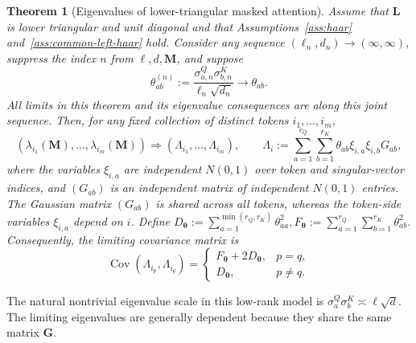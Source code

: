 \documentclass{article}
\newcommand{\weak}{\Rightarrow}
\newcommand{\bM}{\mathbf{M}}
\newcommand{\bL}{\mathbf{L}}
\newcommand{\bG}{\mathbf{G}}
\newtheorem{theorem}{Theorem}
\theoremstyle{definition}
\theoremstyle{remark}
\begin{document}
\begin{theorem}[Eigenvalues of lower-triangular masked attention]
Assume that $\bL$ is lower triangular and unit diagonal and that
Assumptions~\ref{ass:haar} and~\ref{ass:common-left-haar} hold.  Consider any sequence
$(\ell_n,d_n)\to(\infty,\infty)$, suppress the index $n$ from $\ell,d,\bM$, and
suppose
\[
    \theta_{ab}^{(n)}
    :=
    \frac{\sigma^Q_{a,n}\sigma^K_{b,n}}{\ell_n\sqrt {d_n}}
    \longrightarrow \theta_{ab}.
\]
All limits in this theorem and its eigenvalue consequences are along this
joint sequence.
Then, for any fixed collection of distinct tokens $i_1,\ldots,i_m$,
\begin{equation}
    \left(\lambda_{i_1}(\bM),\ldots,\lambda_{i_m}(\bM)\right)
    \weak
    \left(\Lambda_{i_1},\ldots,\Lambda_{i_m}\right),
    \qquad
    \Lambda_i
    :=
    \sum_{a=1}^{r_Q}\sum_{b=1}^{r_K}
    \theta_{ab}\xi_{i,a}\xi_{i,b}G_{ab},
    \label{eq:common-haar-eigenvalue-limit}
\end{equation}
where the variables $\xi_{i,a}$ are independent $N(0,1)$ over token and
singular-vector indices, and $(G_{ab})$ is an independent matrix of independent
$N(0,1)$ entries.  The Gaussian matrix $(G_{ab})$ is shared across all tokens,
whereas the token-side variables $\xi_{i,a}$ depend on $i$.  Define
\(
    D_{\boldsymbol{\theta}}
    :=
    \sum_{a=1}^{\min(r_Q,r_K)}\theta_{aa}^2,
    F_{\boldsymbol{\theta}}
    :=
    \sum_{a=1}^{r_Q}\sum_{b=1}^{r_K}\theta_{ab}^2.
\)
Consequently, the limiting covariance matrix is
\begin{equation}
    \operatorname{Cov}\left(\Lambda_{i_p},\Lambda_{i_q}\right)
    =
    \begin{cases}
    F_{\boldsymbol{\theta}}+2D_{\boldsymbol{\theta}},
        & p=q,\\
    D_{\boldsymbol{\theta}},
        & p\neq q.
    \end{cases}
    \label{eq:common-haar-eigenvalue-covariance}
\end{equation}
\label{thm:lower-triangular-eigenvalues}
\end{theorem}

The natural nontrivial eigenvalue scale in this low-rank model is
$\sigma^Q_a\sigma^K_b\asymp \ell\sqrt d$.  The limiting eigenvalues are
generally dependent because they share the same matrix $\bG$.
\end{document}
